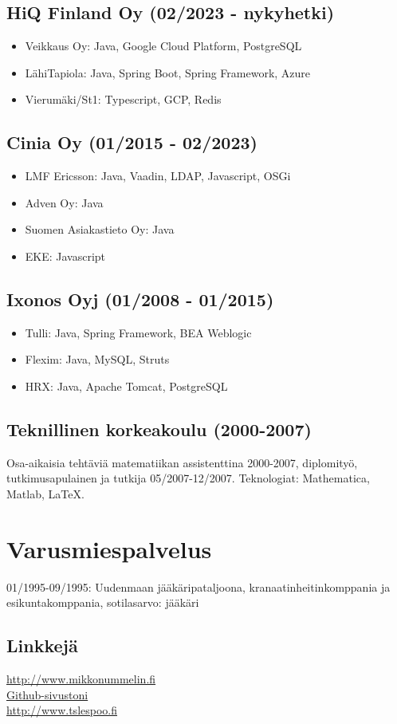 \documentclass[a4paper,12pt]{article}
\begin{document}
\subsection*{HiQ Finland Oy (02/2023 - nykyhetki)}
\begin{itemize}
\item{Veikkaus Oy: Java, Google Cloud Platform, PostgreSQL}
\item{LähiTapiola: Java, Spring Boot, Spring Framework, Azure}
\item{Vierumäki/St1: Typescript, GCP, Redis}
\end{itemize}
\subsection*{Cinia Oy (01/2015 - 02/2023)}
\begin{itemize}
\item{LMF Ericsson: Java, Vaadin, LDAP, Javascript, OSGi}
\item{Adven Oy: Java}
\item{Suomen Asiakastieto Oy: Java}
\item{EKE: Javascript}
\end{itemize}
\subsection*{Ixonos Oyj (01/2008 - 01/2015)}
\begin{itemize}
\item{Tulli: Java, Spring Framework, BEA Weblogic}
\item{Flexim: Java, MySQL, Struts}
\item{HRX: Java, Apache Tomcat, PostgreSQL}
\end{itemize}
\subsection*{Teknillinen korkeakoulu (2000-2007)}
Osa-aikaisia tehtäviä matematiikan assistenttina 2000-2007, diplomityö, tutkimusapulainen ja tutkija 05/2007-12/2007. Teknologiat: Mathematica, Matlab, LaTeX.
\section*{Varusmiespalvelus}
01/1995-09/1995: Uudenmaan jääkäripataljoona, kranaatinheitinkomppania ja esikuntakomppania, sotilasarvo: jääkäri
\subsection*{Linkkejä}
\href{http://www.mikkonummelin.fi}{http://www.mikkonummelin.fi} \\
\href{http://github.com/mnummeli}{Github-sivustoni} \\
\href{http://www.tslespoo.fi}{http://www.tslespoo.fi}
\end{document}
